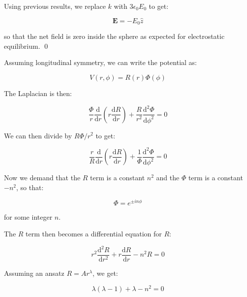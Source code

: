 \documentclass[12pt]{article}
\begin{document}
Using previous results, we replace $k$ with $3\epsilon_{0} E_{0}$ to get:

\begin{equation}
    \mathbf{E} = -E_{0} \hat{z}
\end{equation}

so that the net field is zero inside the sphere as expected for electrostatic equilibrium.
\qed



Assuming longitudinal symmetry, we can write the potential as:

\begin{equation}
    V(r, \phi) = R(r) \Phi(\phi) 
\end{equation}

The Laplacian is then:

\begin{equation}
    \frac{\Phi}{r} \frac{\mathrm{d}}{\mathrm{d}r} \left( r \frac{\mathrm{d}R}{\mathrm{d}r} \right) + \frac{R}{r^{2}} \frac{\mathrm{d}^{2}\Phi}{\mathrm{d}\phi^{2}} = 0
\end{equation}

We can then divide by $R\Phi/r^{2}$ to get:

\begin{equation}
    \frac{r}{R} \frac{\mathrm{d}}{\mathrm{d}r} \left( r \frac{\mathrm{d}R}{\mathrm{d}r} \right) + \frac{1}{\Phi} \frac{\mathrm{d}^{2}\Phi}{\mathrm{d}\phi^{2}} = 0
\end{equation}

Now we demand that the $R$ term is a constant $n^{2}$ and the $\Phi$ term is a constant $-n^{2}$, so that:

\begin{equation}
    \Phi = e^{\pm in\phi}
\end{equation}

for some integer $n$. 

The $R$ term then becomes a differential equation for $R$:

\begin{equation}
    r^{2} \frac{\mathrm{d}^{2}R}{\mathrm{d}r^{2}} + r \frac{\mathrm{d}R}{\mathrm{d}r} - n^{2} R = 0
\end{equation}

Assuming an ansatz $R = Ar^{\lambda}$, we get:

\begin{equation}
    \lambda(\lambda - 1) + \lambda - n^{2} = 0
\end{equation}
\end{document}

